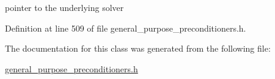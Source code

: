 pointer to the underlying solver 



Definition at line 509 of file general\+\_\+purpose\+\_\+preconditioners.\+h.



The documentation for this class was generated from the following file\+:\begin{DoxyCompactItemize}
\item 
\hyperlink{general__purpose__preconditioners_8h}{general\+\_\+purpose\+\_\+preconditioners.\+h}\end{DoxyCompactItemize}

